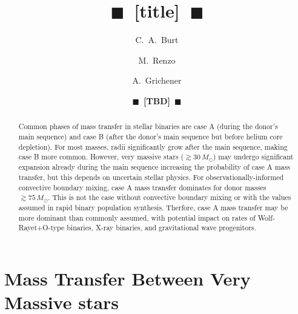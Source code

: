 \documentclass[twocolumn]{aastex63}
\newcommand{\todo}[1]{{\large $\blacksquare$~\textbf{\color{red}[#1]}}~$\blacksquare$}
\begin{document}
\title{\todo{title}}

\author[0009-0008-2061-4946]{C.~A.~Burt}

\author[0000-0002-6718-9472]{M.~Renzo}

\author[0000-0002-2215-1841]{A.~Grichener}

\author{\todo{TBD}}

\begin{abstract}
  Common phases of mass transfer in stellar binaries are case A
  (during the donor's main sequence) and case B (after the donor's
  main sequence but before helium core depletion). For most masses,
  radii significantly grow after the main sequence, making case B more
  common. However, very massive stars ($\gtrsim 30\,M_\odot$) may
  undergo significant expansion already during the main sequence
  increasing the probability of case A mass transfer, but this depends
  on uncertain stellar physics. For observationally-informed
  convective boundary mixing, case A
  mass transfer dominates for donor masses $\gtrsim 75 \, M_{\odot}$.
  This is not the case without convective boundary mixing or with the
  values assumed in rapid binary population synthesis. Therfore, case
  A mass transfer may be more dominant than commonly assumed, with
  potential impact on rates of Wolf-Rayet+O-type binaries, X-ray
  binaries, and gravitational wave progenitors.
\end{abstract}

\section{Mass Transfer Between Very Massive stars }
\end{document}
